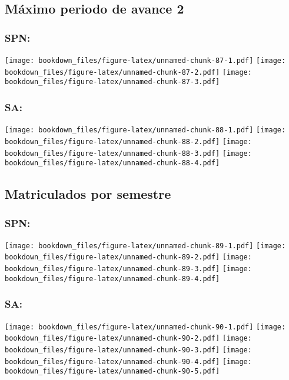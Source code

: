 \documentclass[]{article}
\theoremstyle{definition}
\theoremstyle{definition}
\theoremstyle{definition}
\theoremstyle{remark}
\begin{document}
\subsection{Máximo periodo de avance
2}\label{maximo-periodo-de-avance-2}

\subsubsection{SPN:}\label{spn}

\texttt{[image: bookdown\_files/figure-latex/unnamed-chunk-87-1.pdf]}
\texttt{[image: bookdown\_files/figure-latex/unnamed-chunk-87-2.pdf]}
\texttt{[image: bookdown\_files/figure-latex/unnamed-chunk-87-3.pdf]}

\subsubsection{SA:}\label{sa}

\texttt{[image: bookdown\_files/figure-latex/unnamed-chunk-88-1.pdf]}
\texttt{[image: bookdown\_files/figure-latex/unnamed-chunk-88-2.pdf]}
\texttt{[image: bookdown\_files/figure-latex/unnamed-chunk-88-3.pdf]}
\texttt{[image: bookdown\_files/figure-latex/unnamed-chunk-88-4.pdf]}

\subsection{Matriculados por
semestre}\label{matriculados-por-semestre-1}

\subsubsection{SPN:}\label{spn-1}

\texttt{[image: bookdown\_files/figure-latex/unnamed-chunk-89-1.pdf]}
\texttt{[image: bookdown\_files/figure-latex/unnamed-chunk-89-2.pdf]}
\texttt{[image: bookdown\_files/figure-latex/unnamed-chunk-89-3.pdf]}
\texttt{[image: bookdown\_files/figure-latex/unnamed-chunk-89-4.pdf]}

\subsubsection{SA:}\label{sa-1}

\texttt{[image: bookdown\_files/figure-latex/unnamed-chunk-90-1.pdf]}
\texttt{[image: bookdown\_files/figure-latex/unnamed-chunk-90-2.pdf]}
\texttt{[image: bookdown\_files/figure-latex/unnamed-chunk-90-3.pdf]}
\texttt{[image: bookdown\_files/figure-latex/unnamed-chunk-90-4.pdf]}
\texttt{[image: bookdown\_files/figure-latex/unnamed-chunk-90-5.pdf]}
\end{document}
